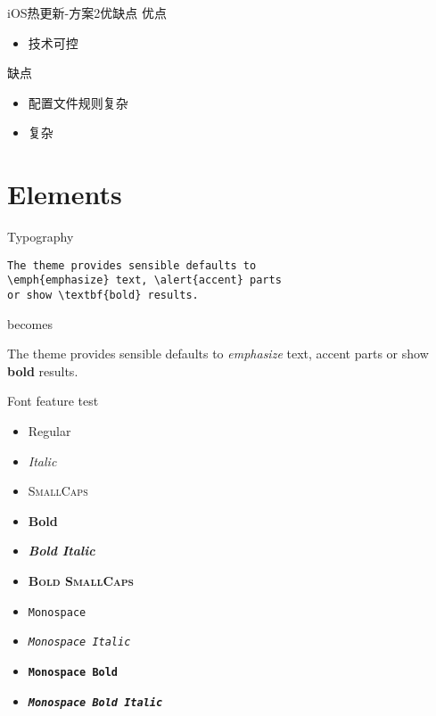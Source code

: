 \documentclass[10pt]{beamer}
\begin{document}
\begin{frame}{iOS热更新-方案2优缺点}
  优点
  \begin{itemize}
    \item 技术可控
	\end{itemize}
  缺点
  \begin{itemize}
    \item 配置文件规则复杂
    \item 复杂
  \end{itemize}
\end{frame}

\section{Elements}

\begin{frame}[fragile]{Typography}
      \begin{verbatim}The theme provides sensible defaults to
\emph{emphasize} text, \alert{accent} parts
or show \textbf{bold} results.\end{verbatim}

  \begin{center}becomes\end{center}

  The theme provides sensible defaults to \emph{emphasize} text,
  \alert{accent} parts or show \textbf{bold} results.
\end{frame}

\begin{frame}{Font feature test}
  \begin{itemize}
    \item Regular
    \item \textit{Italic}
    \item \textsc{SmallCaps}
    \item \textbf{Bold}
    \item \textbf{\textit{Bold Italic}}
    \item \textbf{\textsc{Bold SmallCaps}}
    \item \texttt{Monospace}
    \item \texttt{\textit{Monospace Italic}}
    \item \texttt{\textbf{Monospace Bold}}
    \item \texttt{\textbf{\textit{Monospace Bold Italic}}}
  \end{itemize}
\end{frame}
\end{document}
